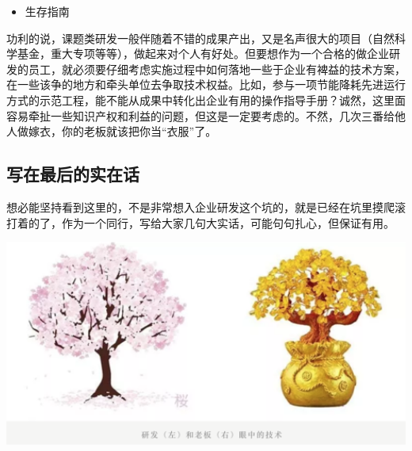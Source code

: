 \documentclass[]{book}
\providecommand{\tightlist}{%
  \setlength{\itemsep}{0pt}\setlength{\parskip}{0pt}}
\begin{document}
\begin{itemize}
\tightlist
\item
  生存指南
\end{itemize}

功利的说，课题类研发一般伴随着不错的成果产出，又是名声很大的项目（自然科学基金，重大专项等等），做起来对个人有好处。但要想作为一个合格的做企业研发的员工，就必须要仔细考虑实施过程中如何落地一些于企业有裨益的技术方案，在一些该争的地方和牵头单位去争取技术权益。比如，参与一项节能降耗先进运行方式的示范工程，能不能从成果中转化出企业有用的操作指导手册？诚然，这里面容易牵扯一些知识产权和利益的问题，但这是一定要考虑的。不然，几次三番给他人做嫁衣，你的老板就该把你当``衣服''了。

\subsection{写在最后的实在话}

想必能坚持看到这里的，不是非常想入企业研发这个坑的，就是已经在坑里摸爬滚打着的了，作为一个同行，写给大家几句大实话，可能句句扎心，但保证有用。

\includegraphics[width=6.67in]{images/qiye6}
\end{document}
